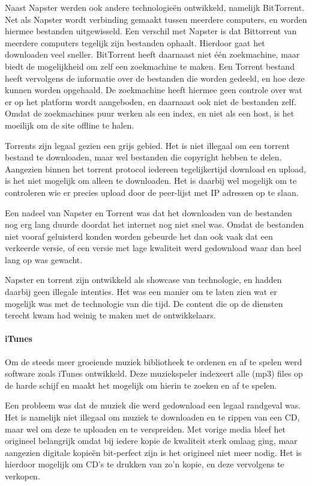 Naast Napster werden ook andere technologieën ontwikkeld, namelijk BitTorrent. Net als Napster wordt verbinding gemaakt tussen meerdere computers, en worden hiermee bestanden uitgewisseld. Een verschil met Napster is dat Bittorrent van meerdere computers tegelijk zijn bestanden ophaalt. Hierdoor gaat het downloaden veel sneller. BitTorrent heeft daarnaast niet één zoekmachine, maar biedt de mogelijkheid om zelf een zoekmachine te maken. Een Torrent bestand heeft vervolgens de informatie over de bestanden die worden gedeeld, en hoe deze kunnen worden opgehaald. De zoekmachine heeft hiermee geen controle over wat er op het platform wordt aangeboden, en daarnaast ook niet de bestanden zelf. Omdat de zoekmachines puur werken als een index, en niet als een host, is het moeilijk om de site offline te halen.

Torrents zijn legaal gezien een grijs gebied. Het is niet illegaal om een torrent bestand te downloaden, maar wel bestanden die copyright hebben te delen. Aangezien binnen het torrent protocol iedereen tegelijkertijd download en upload, is het niet mogelijk om alleen te downloaden. Het is daarbij wel mogelijk om te controleren wie er precies upload door de peer-lijst met IP adressen op te slaan.

Een nadeel van Napster en Torrent was dat het downloaden van de bestanden nog erg lang duurde doordat het internet nog niet snel was. Omdat de bestanden niet vooraf geluisterd konden worden gebeurde het dan ook vaak dat een verkeerde versie, of een versie met lage kwaliteit werd gedownload waar dan heel lang op was gewacht.

Napster en torrent zijn ontwikkeld als showcase van technologie, en hadden daarbij geen illegale intenties. Het was een manier om te laten zien wat er mogelijk was met de technologie van die tijd. De content die op de diensten terecht kwam had weinig te maken met de ontwikkelaars.

\paragraph*{iTunes}
Om de steeds meer groeiende muziek bibliotheek te ordenen en af te spelen werd software zoals iTunes ontwikkeld. Deze muziekspeler indexeert alle (mp3) files op de harde schijf en maakt het mogelijk om hierin te zoeken en af te spelen. 

Een probleem was dat de muziek die werd gedownload een legaal randgeval was. Het is namelijk niet illegaal om muziek te downloaden en te rippen van een CD, maar wel om deze te uploaden en te verspreiden. Met vorige media bleef het origineel belangrijk omdat bij iedere kopie de kwaliteit sterk omlaag ging, maar aangezien digitale kopieën bit-perfect zijn is het origineel niet meer nodig. Het is hierdoor mogelijk om CD's te drukken van zo'n kopie, en deze vervolgens te verkopen.

